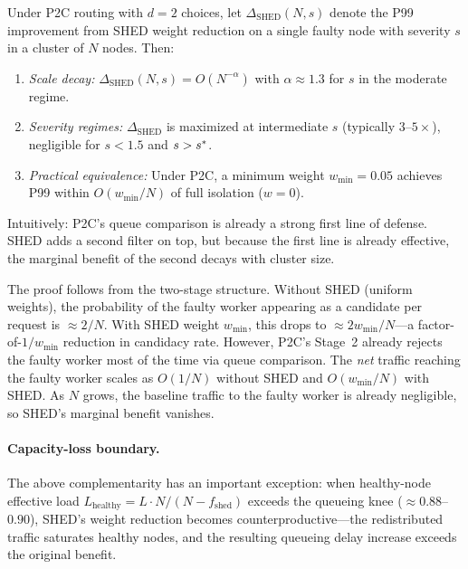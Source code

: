 \begin{proposition}
\label{thm:complementarity}
Under P2C routing with $d = 2$ choices, let $\Delta_{\text{SHED}}(N, s)$
denote the P99 improvement from SHED weight reduction on a single faulty
node with severity $s$ in a cluster of $N$ nodes. Then:
\begin{enumerate}
\item[(a)] \emph{Scale decay:} $\Delta_{\text{SHED}}(N, s) = O(N^{-\alpha})$
  with $\alpha \approx 1.3$ for $s$ in the moderate regime.
\item[(b)] \emph{Severity regimes:} $\Delta_{\text{SHED}}$ is maximized
  at intermediate $s$ (typically $3$--$5\times$), negligible for $s < 1.5$
  and $s > s^{*}$.
\item[(c)] \emph{Practical equivalence:} Under P2C, a minimum weight
  $w_{\min} = 0.05$ achieves P99 within $O(w_{\min}/N)$ of full isolation
  ($w = 0$).
\end{enumerate}
\end{proposition}

Intuitively: P2C's queue comparison is already a strong first line of
defense. SHED adds a second filter on top, but because the first line
is already effective, the marginal benefit of the second decays with
cluster size.

\medskip

The proof follows from the two-stage structure. Without SHED (uniform
weights), the probability of the faulty worker appearing as a candidate
per request is $\approx 2/N$. With SHED weight $w_{\min}$, this drops to
$\approx 2w_{\min}/N$---a factor-of-$1/w_{\min}$ reduction in candidacy
rate. However, P2C's Stage~2 already rejects the faulty worker most of the
time via queue comparison. The \emph{net} traffic reaching the faulty
worker scales as $O(1/N)$ without SHED and $O(w_{\min}/N)$ with SHED. As
$N$ grows, the baseline traffic to the faulty worker is already negligible,
so SHED's marginal benefit vanishes.

\paragraph{Capacity-loss boundary.}
The above complementarity has an important exception: when healthy-node
effective load
$L_{\text{healthy}} = L \cdot N / (N - f_{\text{shed}})$ exceeds the
queueing knee ($\approx 0.88$--$0.90$), SHED's weight reduction becomes
counterproductive---the redistributed traffic saturates healthy nodes,
and the resulting queueing delay increase exceeds the original benefit.

